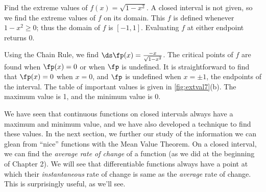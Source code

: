 \begin{example}\label{ex_extval7}
Find the extreme values of $f(x) = \sqrt{1-x^2}$.
\solution
A closed interval is not given, so we find the extreme values of $f$ on its domain. This $f$ is defined whenever $1-x^2\geq 0$; thus the domain of $f$ is $[-1,1]$. Evaluating $f$ at either endpoint returns 0.

Using the Chain Rule, we find $\ds \fp(x) = \frac{-x}{\sqrt{1-x^2}}$. The critical points of $f$ are found when $\fp(x) = 0$ or when $\fp$ is undefined. It is straightforward to find that $\fp(x) = 0$ when $x=0$, and $\fp$ is undefined when $x=\pm 1$, the endpoints of the interval. The table of important values is given in \autoref{fig:extval7}(b). The maximum value is 1, and the minimum value is 0.
\end{example}


We have seen that continuous functions on closed intervals always have a maximum and minimum value, and we have also developed a technique to find these values. In the next section, we further our study of the information we can glean from ``nice'' functions with the Mean Value Theorem. On a closed interval, we can find the \emph{average rate of change} of a function (as we did at the beginning of Chapter 2). We will see that differentiable functions always have a point at which their \emph{instantaneous} rate of change is same as the \emph{average} rate of change. This is surprisingly useful, as we'll see.

